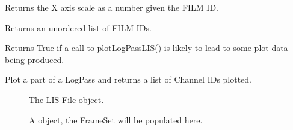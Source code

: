 \documentclass[letterpaper,10pt,english]{sphinxmanual}
\begin{document}
\begin{fulllineitems}
\begin{fulllineitems}
\end{fulllineitems}


\begin{fulllineitems}
\label{\detokenize{ref/util/plot/Plot:TotalDepth.util.plot.Plot.Plot.xScale}}
Returns the X axis scale as a number given the FILM ID.

\end{fulllineitems}


\begin{fulllineitems}
\label{\detokenize{ref/util/plot/Plot:TotalDepth.util.plot.Plot.Plot.filmIdS}}
Returns an unordered list of FILM IDs.

\end{fulllineitems}


\begin{fulllineitems}
\label{\detokenize{ref/util/plot/Plot:TotalDepth.util.plot.Plot.Plot.hasDataToPlotLIS}}
Returns True if a call to plotLogPassLIS() is likely to lead to some
plot data being produced.

\end{fulllineitems}


\begin{fulllineitems}
\label{\detokenize{ref/util/plot/Plot:TotalDepth.util.plot.Plot.Plot.plotLogPassLIS}}
Plot a part of a LogPass and returns a list of Channel IDs plotted.
\begin{description}
\item[{}] \leavevmode
The LIS File object.

\item[{}] \leavevmode
A  object, the FrameSet will be populated here.


\end{description}
\end{fulllineitems}
\end{fulllineitems}
\end{document}
